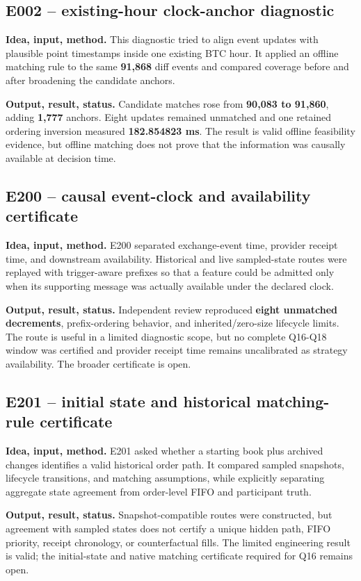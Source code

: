 \documentclass[10pt,a4paper]{article}
\begin{document}
\subsection{E002 -- existing-hour clock-anchor diagnostic}
\textbf{Idea, input, method.} This diagnostic tried to align event updates with plausible point timestamps inside one existing BTC hour. It applied an offline matching rule to the same \textbf{91,868} diff events and compared coverage before and after broadening the candidate anchors.\par
\textbf{Output, result, status.} Candidate matches rose from \textbf{90,083 to 91,860}, adding \textbf{1,777} anchors. Eight updates remained unmatched and one retained ordering inversion measured \textbf{182.854823 ms}. The result is valid offline feasibility evidence, but offline matching does not prove that the information was causally available at decision time.\par
\subsection{E200 -- causal event-clock and availability certificate}
\textbf{Idea, input, method.} E200 separated exchange-event time, provider receipt time, and downstream availability. Historical and live sampled-state routes were replayed with trigger-aware prefixes so that a feature could be admitted only when its supporting message was actually available under the declared clock.\par
\textbf{Output, result, status.} Independent review reproduced \textbf{eight unmatched decrements}, prefix-ordering behavior, and inherited/zero-size lifecycle limits. The route is useful in a limited diagnostic scope, but no complete Q16-Q18 window was certified and provider receipt time remains uncalibrated as strategy availability. The broader certificate is open.\par
\subsection{E201 -- initial state and historical matching-rule certificate}
\textbf{Idea, input, method.} E201 asked whether a starting book plus archived changes identifies a valid historical order path. It compared sampled snapshots, lifecycle transitions, and matching assumptions, while explicitly separating aggregate state agreement from order-level FIFO and participant truth.\par
\textbf{Output, result, status.} Snapshot-compatible routes were constructed, but agreement with sampled states does not certify a unique hidden path, FIFO priority, receipt chronology, or counterfactual fills. The limited engineering result is valid; the initial-state and native matching certificate required for Q16 remains open.\par
\end{document}
